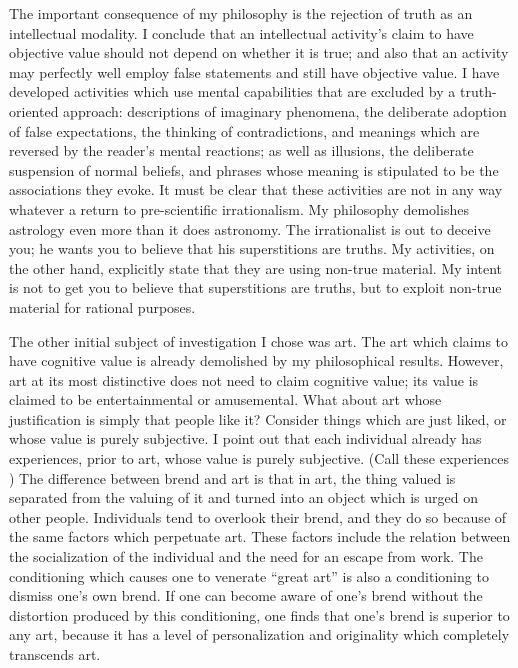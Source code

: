 The important consequence of my philosophy is the rejection of truth 
as an intellectual modality. I conclude that an intellectual activity's claim to 
have objective value should not depend on whether it is true; and also that 
an activity may perfectly well employ false statements and still have 
objective value. I have developed activities which use mental capabilities that 
are excluded by a truth-oriented approach: descriptions of imaginary 
phenomena, the deliberate adoption of false expectations, the thinking of 
contradictions, and meanings which are reversed by the reader's mental 
reactions; as well as illusions, the deliberate suspension of normal beliefs, and 
phrases whose meaning is stipulated to be the associations they evoke. It 
must be clear that these activities are not in any way whatever a return to 
pre-scientific irrationalism. My philosophy demolishes astrology even more 
than it does astronomy. The irrationalist is out to deceive you; he wants you 
to believe that his superstitions are truths. My activities, on the other hand, 
explicitly state that they are using non-true material. My intent is not to get 
you to believe that superstitions are truths, but to exploit non-true material 
for rational purposes. 

The other initial subject of investigation I chose was art. The art which 
claims to have cognitive value is already demolished by my philosophical 
results. However, art at its most distinctive does not need to claim cognitive 
value; its value is claimed to be entertainmental or amusemental. What about 
art whose justification is simply that people like it? Consider things which 
are just liked, or whose value is purely subjective. I point out that each 
individual already has experiences, prior to art, whose value is purely 
subjective. (Call these experiences ) The difference between brend 
and art is that in art, the thing valued is separated from the valuing of it and 
turned into an object which is urged on other people. Individuals tend to 
overlook their brend, and they do so because of the same factors which 
perpetuate art. These factors include the relation between the socialization 
of the individual and the need for an escape from work. The conditioning 
which causes one to venerate \enquote{great art} is also a conditioning to dismiss 
one's own brend. If one can become aware of one's brend without the 
distortion produced by this conditioning, one finds that one's brend is 
superior to any art, because it has a level of personalization and originality 
which completely transcends art. 

